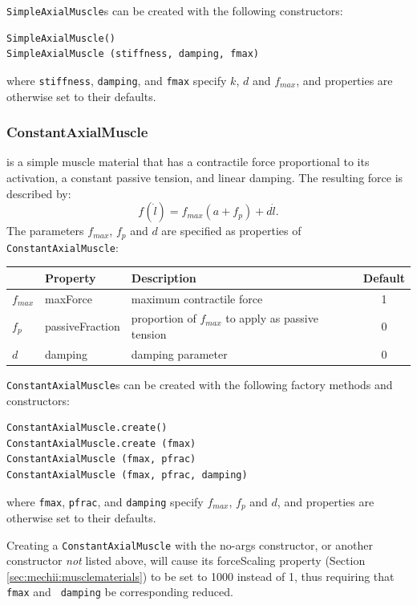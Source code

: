 {\tt SimpleAxialMuscle}s can be created with the following
constructors:
\begin{lstlisting}[]
SimpleAxialMuscle()
SimpleAxialMuscle (stiffness, damping, fmax)
\end{lstlisting}
%
where {\tt stiffness}, {\tt damping}, and {\tt fmax} specify $k$, $d$
and $f_{max}$, and properties are otherwise set to their defaults.

\subsubsection{ConstantAxialMuscle}

is a simple muscle material that has a contractile force proportional
to its activation, a constant passive tension, and linear damping.
The resulting force is described by:
%
\begin{equation}
f(\dot l) = f_{max} ( a  +  f_{p} ) + d \dot l.
\label{ConstantAxialMaterial:eqn}
\end{equation}
%
The parameters $f_{max}$, $f_{p}$ and $d$ are specified as properties of
{\tt ConstantAxialMuscle}:

\begin{center}
\begin{tabular}{|l|l|l|c|} \hline
 & Property & Description & Default \\
\hline
$f_{max}$ & {\sf maxForce} & maximum contractile force & 1 \\
$f_{p}$ & {\sf passiveFraction} & 
proportion of $f_{max}$ to apply as passive tension & 0 \\
$d$ & {\sf damping} & damping parameter & 0 \\
\hline
\end{tabular}
\end{center}

{\tt ConstantAxialMuscle}s can be created with the following factory
methods and constructors:
\begin{lstlisting}[]
ConstantAxialMuscle.create()
ConstantAxialMuscle.create (fmax)
ConstantAxialMuscle (fmax, pfrac)
ConstantAxialMuscle (fmax, pfrac, damping)
\end{lstlisting}
%
where {\tt fmax}, {\tt pfrac}, and {\tt damping} specify $f_{max}$, $f_p$
and $d$, and properties are otherwise set to their defaults.

\begin{sideblock}
Creating a {\tt ConstantAxialMuscle} with the no-args constructor, or
another constructor {\it not} listed above, will cause its {\sf
forceScaling} property (Section \ref{sec:mechii:musclematerials}) to
be set to 1000 instead of 1, thus requiring that {\tt fmax} and {\tt
damping} be corresponding reduced.
\end{sideblock}

